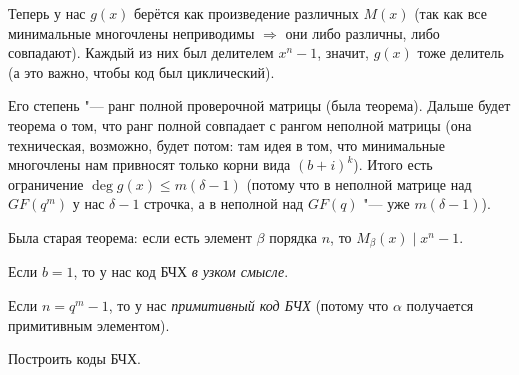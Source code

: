 Теперь у нас $g(x)$ берётся как произведение различных $M(x)$
(так как все минимальные многочлены неприводимы $\Rightarrow$
они либо различны, либо совпадают).
Каждый из них был делителем $x^n-1$, значит, $g(x)$ тоже делитель
(а это важно, чтобы код был циклический).

Его степень "--- ранг полной проверочной матрицы
(была теорема).
Дальше будет теорема о том, что ранг полной совпадает
с рангом неполной матрицы (она техническая, возможно, будет потом:
там идея в том, что минимальные многочлены нам привносят только корни
вида $(b+i)^k$).
Итого есть ограничение $\deg g(x) \le m(\delta - 1)$
(потому что в неполной матрице над $GF(q^m)$ у нас
$\delta-1$ строчка, а в неполной над $GF(q)$ "--- уже $m(\delta-1)$).

\begin{theorem}
	Была старая теорема: если есть элемент $\beta$ порядка
	$n$, то $M_\beta(x) \mid x^n-1$.
\end{theorem}
\begin{Def}
	Если $b=1$, то у нас код БЧХ \textit{в узком смысле}.
\end{Def}
\begin{Def}
	Если $n=q^m-1$, то у нас \textit{примитивный код БЧХ}
	(потому что $\alpha$ получается примитивным элементом).
\end{Def}

\begin{Exercise}
	Построить коды БЧХ.
\end{Exercise}

